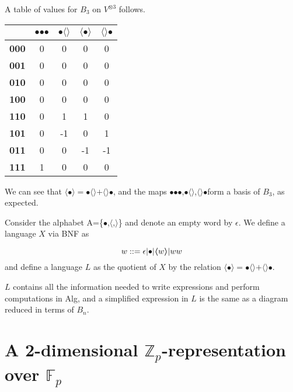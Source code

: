 \documentclass[11pt]{article} %
\newcommand{\lcap}{\boldmath$\langle$\unboldmath}
\newcommand{\rcap}{\boldmath$\rangle$\unboldmath}
\newcommand{\dotmap}{$\bullet$}
\begin{document}
A table of values for $B_3$ on $V^{\otimes 3}$ follows.

\begin{center}
\begin{tabular}{| c | c | c | c | c |}
  \hline
   & \dotmap\dotmap\dotmap & \dotmap\lcap\rcap & \lcap\dotmap\rcap & \lcap\rcap\dotmap \\
  \hline			
  \textbf{000} & 0 & 0 & 0 & 0 \\
  \hline
  \textbf{001} & 0 & 0 & 0 & 0 \\
  \hline
  \textbf{010} & 0 & 0 & 0 & 0\\
  \hline
  \textbf{100} & 0 & 0 & 0 & 0\\
  \hline
  \textbf{110} & 0 & 1 & 1 & 0\\
  \hline
  \textbf{101} & 0 & -1 & 0 & 1\\
  \hline
  \textbf{011} & 0 & 0 & -1 & -1\\
  \hline
  \textbf{111} & 1 & 0 & 0 & 0\\
  \hline  
\end{tabular}
\end{center}

We can see that \lcap\dotmap\rcap$=$\dotmap\lcap\rcap$+$\lcap\rcap\dotmap, and the maps \dotmap\dotmap\dotmap,\dotmap\lcap\rcap,\lcap\rcap\dotmap\hspace{1.25mm}form a basis of $B_3$, as expected.

\begin{mydef} Consider the alphabet A=\{\dotmap,\lcap,\rcap\} and denote an empty word by $\epsilon$. We define a language $X$ via BNF as

$$ w ::= \epsilon | \text{\dotmap} | \text{\lcap} w \text{\rcap} | ww $$
and define a language $L$ as the quotient of $X$ by the relation \lcap\dotmap\rcap$=$\dotmap\lcap\rcap$+$\lcap\rcap\dotmap.
\end{mydef}

$L$ contains all the information needed to write expressions and perform computations in Alg, and a simplified expression in $L$ is the same as a diagram reduced in terms of $B_n$.


\section{A 2-dimensional $\mathbb{Z}_p$-representation over $\mathbb{F}_p$}
\end{document}
